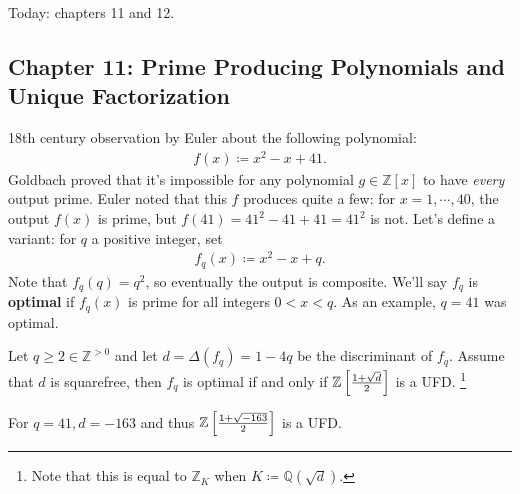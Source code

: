 \begin{remark}

Today: chapters 11 and 12.

\end{remark}

\hypertarget{chapter-11-prime-producing-polynomials-and-unique-factorization}{%
\subsection{Chapter 11: Prime Producing Polynomials and Unique
Factorization}\label{chapter-11-prime-producing-polynomials-and-unique-factorization}}

\begin{remark}

18th century observation by Euler about the following polynomial:
\begin{align*}
f(x) \coloneqq x^2 -x + 41 
.\end{align*}
Goldbach proved that it's impossible for any polynomial
\(g\in {\mathbb{Z}}[x]\) to have \emph{every} output prime. Euler noted
that this \(f\) produces quite a few: for \(x=1, \cdots, 40\), the
output \(f(x)\) is prime, but \(f(41) = 41^2 - 41 + 41 = 41^2\) is not.
Let's define a variant: for \(q\) a positive integer, set
\begin{align*}
f_q(x) \coloneqq x^2 - x + q
.\end{align*}
Note that \(f_q(q) = q^2\), so eventually the output is composite. We'll
say \(f_q\) is \textbf{optimal} if \(f_q(x)\) is prime for all integers
\(0 < x < q\). As an example, \(q=41\) was optimal.

\end{remark}

\begin{theorem}[Rabinowitz]

Let \(q \geq 2 \in {\mathbb{Z}}^{> 0}\) and let
\(d = \Delta(f_q) = 1-4q\) be the discriminant of \(f_q\). Assume that
\(d\) is squarefree, then \(f_q\) is optimal if and only if
\(\mathbb{Z}\left[ { {1 + \sqrt{d}\over 2 }} \right]\) is a UFD.
\footnote{Note that this is equal to \({\mathbb{Z}}_K\) when
  \(K\coloneqq{\mathbb{Q}}( \sqrt{d} )\).}

\end{theorem}

\begin{example}

For \(q=41, d = -163\) and thus
\(\mathbb{Z}\left[ { {1 + \sqrt{-163} \over 2}} \right]\) is a UFD.

\end{example}


